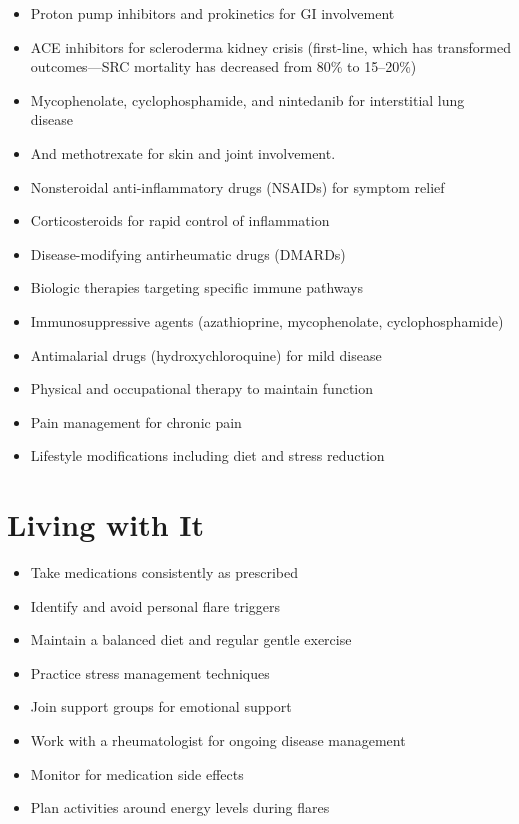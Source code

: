 \begin{itemize}[noitemsep]
  \item Proton pump inhibitors and prokinetics for GI involvement
  \item ACE inhibitors for scleroderma kidney crisis (first-line, which has transformed outcomes---SRC mortality has decreased from 80\% to 15--20\%)
  \item Mycophenolate, cyclophosphamide, and nintedanib for interstitial lung disease
  \item And methotrexate for skin and joint involvement.
  \item Nonsteroidal anti-inflammatory drugs (NSAIDs) for symptom relief
  \item Corticosteroids for rapid control of inflammation
  \item Disease-modifying antirheumatic drugs (DMARDs)
  \item Biologic therapies targeting specific immune pathways
  \item Immunosuppressive agents (azathioprine, mycophenolate, cyclophosphamide)
  \item Antimalarial drugs (hydroxychloroquine) for mild disease
  \item Physical and occupational therapy to maintain function
  \item Pain management for chronic pain
  \item Lifestyle modifications including diet and stress reduction
\end{itemize}
\section{Living with It}
\begin{itemize}[noitemsep]
  \item Take medications consistently as prescribed
  \item Identify and avoid personal flare triggers
  \item Maintain a balanced diet and regular gentle exercise
  \item Practice stress management techniques
  \item Join support groups for emotional support
  \item Work with a rheumatologist for ongoing disease management
  \item Monitor for medication side effects
  \item Plan activities around energy levels during flares
\end{itemize}
